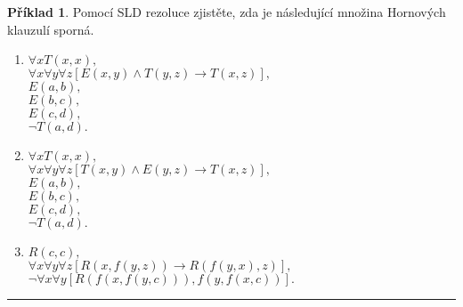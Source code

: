 \documentclass[a4paper]{article}
\theoremstyle{definition}
\newtheorem{priklad}{Příklad}
\begin{document}
\begin{priklad}
    Pomocí SLD rezoluce zjistěte, zda je následující množina Hornových klauzulí sporná.
\end{priklad}
\begin{enumerate}
    \item $ \forall xT(x,x), $\\
    $ \forall x\forall y\forall z\left[E(x,y)\wedge T(y,z)\rightarrow T(x,z)\right], $\\
    $ E(a,b), $\\
    $ E(b,c), $\\
    $ E(c,d), $\\
    $ \neg T(a,d). $
    \item $ \forall xT(x,x), $\\
    $ \forall x\forall y\forall z\left[T(x,y)\wedge E(y,z)\rightarrow T(x,z)\right], $\\
    $ E(a,b), $\\
    $ E(b,c), $\\
    $ E(c,d), $\\
    $ \neg T(a,d). $
    \item $ R(c,c), $\\
    $ \forall x\forall y\forall z\left[R(x,f(y,z))\rightarrow R(f(y,x),z)\right], $\\
    $ \neg\forall x\forall y\left[R(f(x,f(y,c))),f(y,f(x,c))\right]. $
\end{enumerate}
\noindent\rule{\linewidth}{.2pt}
\end{document}
